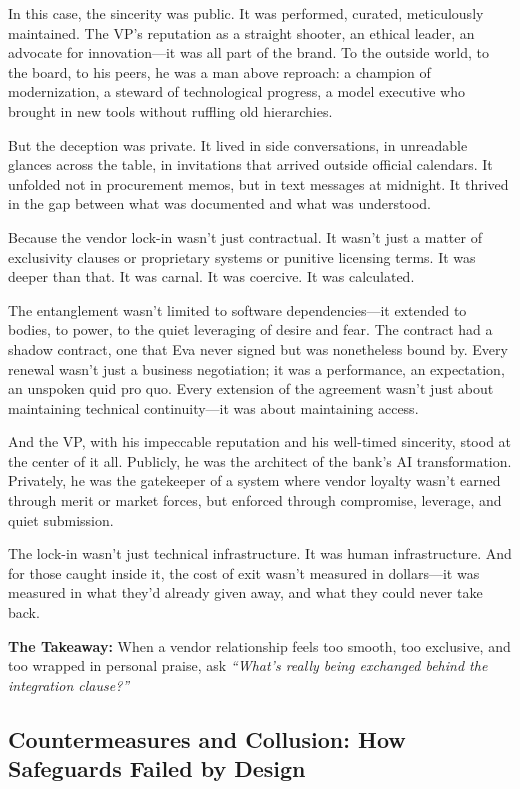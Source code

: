 In this case, the sincerity was public. It was performed, curated, meticulously maintained. The VP’s reputation as a straight shooter, an ethical leader, an advocate for innovation—it was all part of the brand. To the outside world, to the board, to his peers, he was a man above reproach: a champion of modernization, a steward of technological progress, a model executive who brought in new tools without ruffling old hierarchies.

But the deception was private. It lived in side conversations, in unreadable glances across the table, in invitations that arrived outside official calendars. It unfolded not in procurement memos, but in text messages at midnight. It thrived in the gap between what was documented and what was understood.

Because the vendor lock-in wasn’t just contractual. It wasn’t just a matter of exclusivity clauses or proprietary systems or punitive licensing terms. It was deeper than that. It was carnal. It was coercive. It was calculated.

The entanglement wasn’t limited to software dependencies—it extended to bodies, to power, to the quiet leveraging of desire and fear. The contract had a shadow contract, one that Eva never signed but was nonetheless bound by. Every renewal wasn’t just a business negotiation; it was a performance, an expectation, an unspoken quid pro quo. Every extension of the agreement wasn’t just about maintaining technical continuity—it was about maintaining access.

And the VP, with his impeccable reputation and his well-timed sincerity, stood at the center of it all. Publicly, he was the architect of the bank’s AI transformation. Privately, he was the gatekeeper of a system where vendor loyalty wasn’t earned through merit or market forces, but enforced through compromise, leverage, and quiet submission.

The lock-in wasn’t just technical infrastructure. It was human infrastructure. And for those caught inside it, the cost of exit wasn’t measured in dollars—it was measured in what they’d already given away, and what they could never take back.

\medskip

\textbf{The Takeaway:}  When a vendor relationship feels too smooth, too exclusive, and too wrapped in personal praise, ask \textit{``What’s really being exchanged behind the integration clause?''}


\subsection{Countermeasures and Collusion: How Safeguards Failed by Design}


